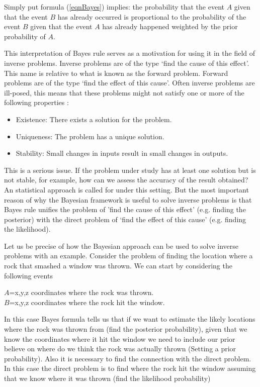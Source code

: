 \documentclass[12pt]{book}
\begin{document}
Simply put  formula (\ref{eqnBayes}) implies: the probability that the event $A$ given that
the event $B$ has already occurred is proportional to the probability of the event $B$ given
that the event $A$ has already happened weighted by the prior probability of $A$.
\newline



This interpretation of Bayes rule serves as a motivation for using it in the field of inverse problems. 
Inverse problems are  of the type `find the cause of this effect'. This name is relative to what is known
as the forward problem. Forward problems are  of the type `find the effect of this cause'. Often inverse problems
are ill-posed, this means
that these problems might  not satisfy one or more of the following properties \cite{lebedev2012functional}:
\begin{itemize}
\item Existence: There exists a solution for the problem.
\item Uniqueness: The problem has a unique solution.
\item Stability: Small changes in inputs result in small changes in outputs.
\end{itemize}
This is a serious issue. If the problem under study has at least one solution but  is not stable, for example, 
how can we assess the accuracy of the result obtained? An statistical approach is called for under
this setting. But the most important reason of why the Bayesian framework is useful to solve inverse problems
is that Bayes rule unifies the problem of 'find the cause of this effect' (e.g. finding the posterior)
with the direct problem of `find the effect of this cause' (e.g. finding the likelihood).

Let us be precise of how the Bayesian approach can be used to solve inverse problems with an example. 
Consider the problem of finding the location where a rock that smashed a window was thrown. We can
start by considering the following events
\begin{center}
$A$=x,y,z coordinates where the rock was thrown.\\
$B$=x,y,z coordinates where the rock hit the window.
\end{center}
In this case Bayes formula  tells us that if we want to estimate the likely locations  where the rock was 
thrown from (find the posterior probability), given that we 
know the coordinates where it hit the window we need to include our prior believe on where
do we think the rock was actually thrown (Setting a prior probability). Also it is necessary
to find the connection with the direct problem. In this case the direct problem is to find where
the rock hit the window assuming that we know where it was thrown (find the likelihood probability) 
\newline
\end{document}
